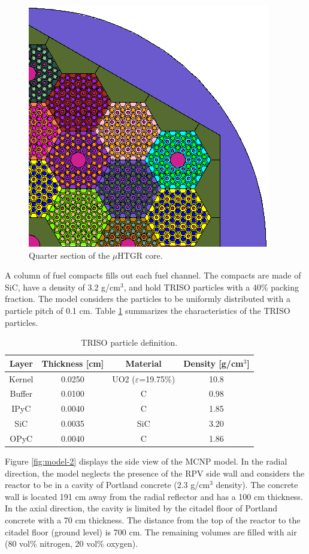 \begin{figure}[htbp!]
  \begin{center}
    \includegraphics[width=0.60\linewidth]{figures/mcnp-diagram-1}
  \end{center}
  \caption{Quarter section of the $\mu$HTGR core.}
  \label{fig:model-1}
\end{figure}

A column of fuel compacts fills out each fuel channel.
The compacts are made of SiC, have a density of 3.2 g/cm$^3$, and hold TRISO particles with a 40\% packing fraction.
The model considers the particles to be uniformly distributed with a particle pitch of 0.1 cm.
Table \ref{table:description} summarizes the characteristics of the TRISO particles.

\begin{table}[!htb]
  \centering
  \caption{TRISO particle definition.}
  \label{table:description} 
  \begin{tabular}{cccc}
  \toprule
   Layer  & Thickness [cm] & Material & Density [g/cm$^3$] \\
  \midrule
   Kernel & 0.0250 & UO2 ($\varepsilon$=19.75\%) & 10.8 \\
   Buffer & 0.0100 & C & 0.98 \\
   IPyC   & 0.0040 & C & 1.85 \\
   SiC    & 0.0035 & SiC & 3.20 \\
   OPyC   & 0.0040 & C & 1.86 \\
  \bottomrule
  \end{tabular}
\end{table}

Figure \ref{fig:model-2} displays the side view of the MCNP model.
In the radial direction, the model neglects the presence of the RPV side wall and considers the reactor to be in a cavity of Portland concrete (2.3 g/cm$^3$ density).
The concrete wall is located 191 cm away from the radial reflector and has a 100 cm thickness.
In the axial direction, the cavity is limited by the citadel floor of Portland concrete with a 70 cm thickness.
The distance from the top of the reactor to the citadel floor (ground level) is 700 cm.
The remaining volumes are filled with air (80 vol\% nitrogen, 20 vol\% oxygen).

